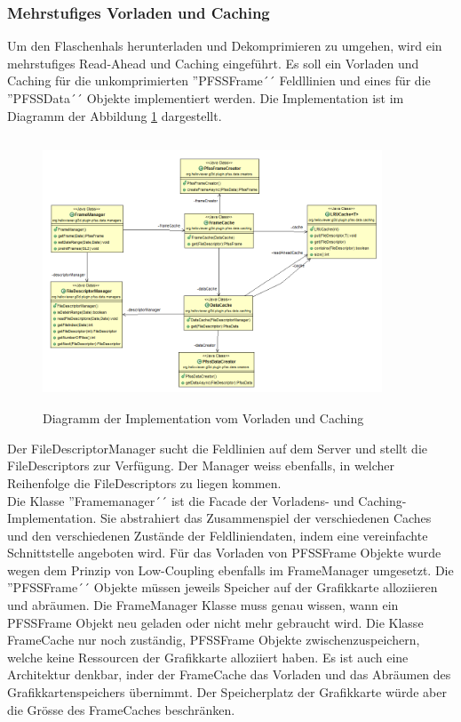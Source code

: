 \subsubsection{Mehrstufiges Vorladen und Caching}
Um den Flaschenhals herunterladen und Dekomprimieren zu umgehen, wird ein mehrstufiges Read-Ahead und Caching eingeführt. Es soll ein Vorladen und Caching für die unkomprimierten ''PFSSFrame´´ Feldllinien und eines für die ''PFSSData´´ Objekte implementiert werden. Die Implementation ist im Diagramm der Abbildung \ref{implementation:architektur:caching} dargestellt.
\begin{figure}[!htbp]
	\center
	\includegraphics[width=0.9\textwidth,height=8cm,keepaspectratio]{./pictures/implementation/architectureCache.png}
	\caption{Diagramm der Implementation vom Vorladen und Caching}
	\label{implementation:architektur:caching}
\end{figure}
Der FileDescriptorManager sucht die Feldlinien auf dem Server und stellt die FileDescriptors zur Verfügung. Der Manager weiss ebenfalls, in welcher Reihenfolge die FileDescriptors zu liegen kommen.\\
Die Klasse ''Framemanager´´ ist die Facade der Vorladens- und Caching- Implementation. Sie abstrahiert das Zusammenspiel der verschiedenen Caches und den verschiedenen Zustände der Feldliniendaten, indem eine vereinfachte Schnittstelle angeboten wird. Für das Vorladen von PFSSFrame Objekte wurde wegen dem Prinzip von Low-Coupling ebenfalls im FrameManager umgesetzt. Die ''PFSSFrame´´ Objekte müssen jeweils Speicher auf der Grafikkarte alloziieren und abräumen. Die FrameManager Klasse muss genau wissen, wann ein PFSSFrame Objekt neu geladen oder nicht mehr gebraucht wird. Die Klasse FrameCache nur noch zuständig, PFSSFrame Objekte zwischenzuspeichern, welche keine Ressourcen der Grafikkarte alloziiert haben. Es ist auch eine Architektur denkbar, inder der FrameCache das Vorladen und das Abräumen des Grafikkartenspeichers übernimmt. Der Speicherplatz der Grafikkarte würde aber die Grösse des FrameCaches beschränken.\\
